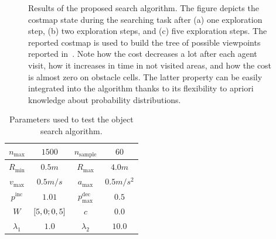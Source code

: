 \begin{figure}[!t]
\begin{center}
\begin{minipage}{.4\linewidth}
		\end{minipage}
	\end{center}
	\caption{Results of the proposed search algorithm. The figure depicts the costmap state during the searching task after
	(a) one exploration step, (b) two exploration steps, and (c) five exploration steps.
	The reported costmap is used to build the tree of possible viewpoints reported in~.
	Note how the cost decreases a lot after each agent visit, how it increases in time in not visited areas, and how the cost
	is almost zero on obstacle cells. The latter property can be easily integrated into the algorithm thanks to its flexibility to
	apriori knowledge about probability distributions.}\label{FIG:SEARCH-RESULTS-COST}
\end{figure}
{
\renewcommand{\arraystretch}{1.35}
\begin{table}[b!]
    \centering
    \begin{tabular}{||c|c||c|c||}
        \hline
        \hline
        $n_{\text{max}}$ & $1500$ & $n_{\text{sample}}$ & $60$ \\
        \hline
        $R_{\text{min}}$ & $0.5m$ & $R_{\text{max}}$ & $4.0m$ \\
        \hline
        $v_{\text{max}}$ & $0.5m/s$ & $a_{\text{max}}$ & $0.5 m/s^2$ \\
        \hline
        $p^{\text{inc}}$ & $1.01$ & $p_{\text{max}}^{\text{dec}}$ & $0.5$ \\
		\hline
		$W$ & $\left[ 5, 0; 0, 5 \right]$ & $c$ & $0.0$ \\
		\hline
		$\lambda_1$ & $1.0$ & $\lambda_2$ & $10.0$ \\
        \hline
        \hline
    \end{tabular}
    \caption{Parameters used to test the object search algorithm.}%
	\label{TAB:SEARCH-PARAMETERS}
\end{table}}

